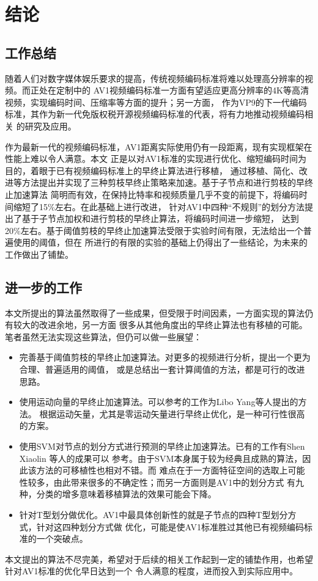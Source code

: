 \chapter{结论}
\label{cha:conclusion}

\section{工作总结}

随着人们对数字媒体娱乐要求的提高，传统视频编码标准将难以处理高分辨率的视频。而正处在定制中的
AV1视频编码标准一方面有望适应更高分辨率的4K等高清视频，实现编码时间、压缩率等方面的提升；另一方面，
作为VP9的下一代编码标准，其作为新一代免版权税开源视频编码标准的代表，将有力地推动视频编码相关
的研究及应用。

作为最新一代的视频编码标准，AV1距离实际使用仍有一段距离，现有实现框架在性能上难以令人满意。本文
正是以对AV1标准的实现进行优化、缩短编码时间为目的，着眼于已有视频编码标准上的早终止算法进行移植，
通过移植、简化、改进等方法提出并实现了三种剪枝早终止策略来加速。基于子节点和进行剪枝的早终止加速算法
简明而有效，在保持比特率和视频质量几乎不变的前提下，将编码时间缩短了15\%左右。在此基础上进行改进，
针对AV1中四种“不规则”的划分方法提出了基于子节点加权和进行剪枝的早终止算法，将编码时间进一步缩短，
达到20\%左右。基于阈值剪枝的早终止加速算法受限于实验时间有限，无法给出一个普遍使用的阈值，但在
所进行的有限的实验的基础上仍得出了一些结论，为未来的工作做出了铺垫。

\section{进一步的工作}

本文所提出的算法虽然取得了一些成果，但受限于时间因素，一方面实现的算法仍有较大的改进余地，另一方面
很多从其他角度出的早终止算法也有移植的可能。笔者虽然无法实现这些算法，但仍可以做一些展望：

\begin{itemize}
    \item 完善基于阈值剪枝的早终止加速算法。对更多的视频进行分析，提出一个更为合理、普遍适用的阈值，
    或是总结出一套计算阈值的方法，都是可行的改进思路。
    \item 使用运动向量的早终止加速算法。可以参考的工作为Libo Yang等人提出的方法\cite{yang2005effective}。
    根据运动矢量，尤其是零运动矢量进行早终止优化，是一种可行性很高的方案。
    \item 使用SVM对节点的划分方式进行预测的早终止加速算法。已有的工作有Shen Xiaolin 等人的成果可以
    参考\cite{shen2013cu}。由于SVM本身属于较为经典且成熟的算法，因此该方法的可移植性也相对不错。而
    难点在于一方面特征空间的选取上可能性较多，由此带来很多的不确定性；而另一方面则是AV1中的划分方式
    有九种，分类的增多意味着移植算法的效果可能会下降。
    \item 针对T型划分做优化。AV1中最具体创新性的就是子节点的四种T型划分方式，针对这四种划分方式做
    优化，可能是使AV1标准胜过其他已有视频编码标准的一个突破点。
\end{itemize}

本文提出的算法不尽完美，希望对于后续的相关工作起到一定的铺垫作用，也希望针对AV1标准的优化早日达到一个
令人满意的程度，进而投入到实际应用中。